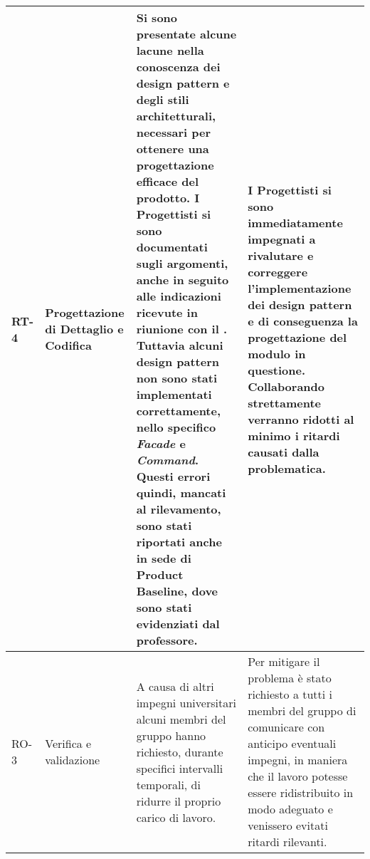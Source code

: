\begin{longtable}{
		>{\centering}p{}
		>{\centering}p{}
		>{\centering\arraybackslash}p{}
		>{\centering\arraybackslash}p{} }
		RT-4
		&
		Progettazione di Dettaglio e Codifica
		&
		Si sono presentate alcune lacune nella conoscenza dei design pattern\ped{\textit{G}} e degli stili architetturali, necessari per ottenere una progettazione efficace del prodotto\ped{\textit{G}}. I Progettisti si sono documentati sugli argomenti, anche in seguito alle indicazioni ricevute in riunione con il \RC{}. Tuttavia alcuni design pattern\ped{\textit{G}} non sono stati implementati correttamente, nello specifico \textit{Facade} e \textit{Command}. Questi errori quindi, mancati al rilevamento, sono stati riportati anche in sede di Product Baseline\ped{\textit{G}}, dove sono stati evidenziati dal professore.
		&
		I Progettisti si sono immediatamente impegnati a rivalutare e correggere l'implementazione dei design pattern\ped{\textit{G}} e di conseguenza la progettazione del modulo\ped{\textit{G}} in questione. Collaborando strettamente verranno ridotti al minimo i ritardi causati dalla problematica.\\
\hline
		RO-3
		&
		Verifica e validazione
		&
		A causa di altri impegni universitari alcuni membri del gruppo hanno richiesto, durante specifici intervalli temporali, di ridurre il proprio carico di lavoro. 
		&
		Per mitigare il problema è stato richiesto a tutti i membri del gruppo di comunicare con anticipo eventuali impegni, in maniera che il lavoro potesse essere ridistribuito in modo adeguato e venissero evitati ritardi rilevanti. \\
	\end{longtable}

